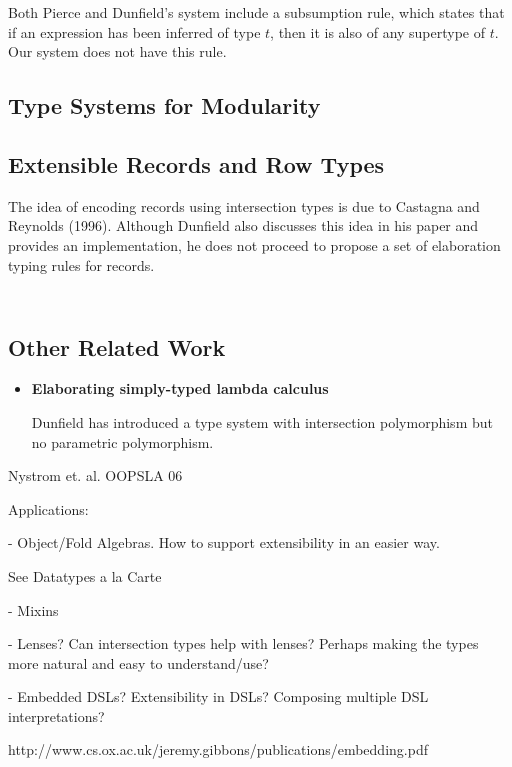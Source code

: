 Both Pierce and Dunfield's system include a subsumption rule, which states that
if an expression has been inferred of type $ t $, then it is also of any
supertype of $ t $. Our system does not have this rule.

\subsection{Type Systems for Modularity}

\subsection{Extensible Records and Row Types}

\cite{cardelli1992extensible}

The idea of encoding records using intersection types is due to Castagna and
Reynolds (1996). Although Dunfield also discusses this idea in his paper
\cite{dunfield2014elaborating} and provides an implementation, he does not
proceed to propose a set of elaboration typing rules for records.

\begin{lstlisting}
\end{lstlisting}

\begin{lstlisting}
\end{lstlisting}

\subsection{Other Related Work}

\begin{itemize}

\item{\bf Elaborating simply-typed lambda calculus}

  Dunfield has introduced a type system with intersection polymorphism but no
  parametric polymorphism.

\end{itemize}

Nystrom et. al. OOPSLA 06

Applications:

- Object/Fold Algebras. How to support extensibility in an easier way.

See Datatypes a la Carte

- Mixins

- Lenses? Can intersection types help with lenses? Perhaps making the
types more natural and easy to understand/use?

- Embedded DSLs? Extensibility in DSLs? Composing multiple DSL interpretations?

http://www.cs.ox.ac.uk/jeremy.gibbons/publications/embedding.pdf
